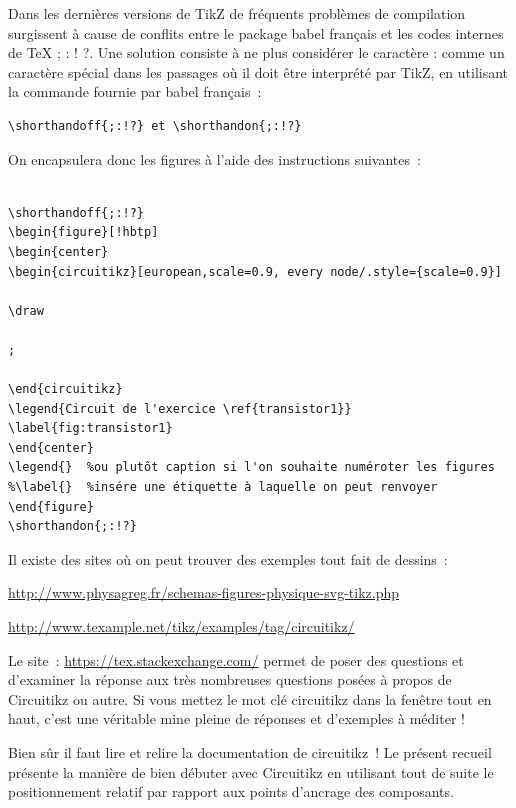 \documentclass[10pt]{article}
\begin{document}
\vspace{1cm}

Dans les dernières versions de TikZ de fréquents problèmes de compilation surgissent à cause de conflits entre le package babel français et les codes internes de \TeX{}  \og  ; : ! ?\fg. Une solution consiste à ne plus considérer le caractère \og : \fg{} comme un caractère spécial dans les passages où il doit être interprété par TikZ, en utilisant la commande fournie par babel français~: \begin{verbatim}\shorthandoff{;:!?} et \shorthandon{;:!?} \end{verbatim} 


On encapsulera donc les figures à l'aide des instructions suivantes~:

\begin{verbatim}

\shorthandoff{;:!?}
\begin{figure}[!hbtp]
\begin{center}
\begin{circuitikz}[european,scale=0.9, every node/.style={scale=0.9}]

\draw

;

\end{circuitikz}
\legend{Circuit de l'exercice \ref{transistor1}}
\label{fig:transistor1}
\end{center}
\legend{}  %ou plutôt caption si l'on souhaite numéroter les figures
%\label{}  %insére une étiquette à laquelle on peut renvoyer
\end{figure}
\shorthandon{;:!?}

\end{verbatim}

\newpage


Il existe des sites où on peut trouver des exemples tout fait de dessins~:

\url{http://www.physagreg.fr/schemas-figures-physique-svg-tikz.php}


\url{http://www.texample.net/tikz/examples/tag/circuitikz/}

Le site~: \url{https://tex.stackexchange.com/} permet de poser des questions et d'examiner la réponse aux très nombreuses questions posées à propos de Circuitikz ou autre. Si vous mettez le mot clé \og  circuitikz \fg dans la fenêtre tout en haut, c'est une véritable mine pleine de réponses et d'exemples à méditer !



Bien sûr il faut lire et relire la documentation de circuitikz~! Le présent recueil présente la manière de bien débuter avec Circuitikz en utilisant tout de suite le positionnement relatif par rapport aux points d'ancrage des composants.
\end{document}
